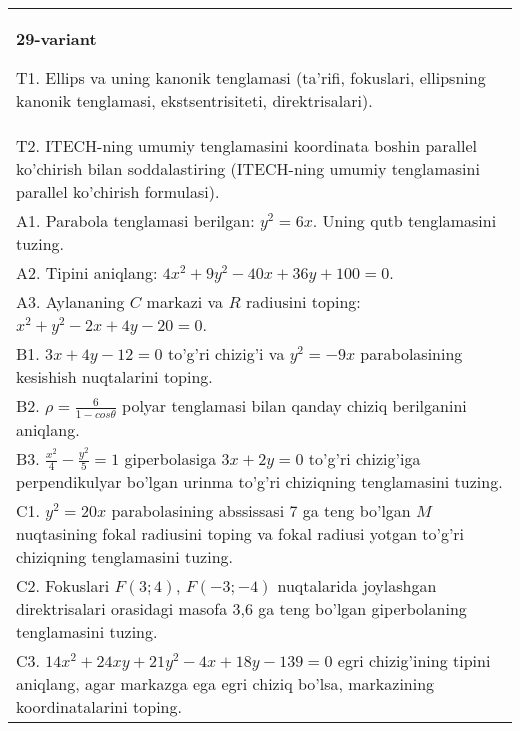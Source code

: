 \documentclass{article}
\begin{document}
\begin{tabular}{m{17cm}}
\textbf{29-variant}
\newline

T1. Ellips va uning kanonik tenglamasi (ta'rifi, fokuslari, ellipsning kanonik tenglamasi, ekstsentrisiteti, direktrisalari).\\

T2. ITECH-ning umumiy tenglamasini koordinata boshin parallel ko'chirish bilan soddalastiring (ITECH-ning umumiy tenglamasini parallel ko'chirish formulasi).\\

A1. Parabola tenglamasi berilgan: $y^2=6x$. Uning qutb tenglamasini tuzing.\\

A2. Tipini aniqlang: $4x^2+9y^2-40x+36y+100=0$.\\

A3. Aylananing $C$ markazi va $R$ radiusini toping: $x^2+y^2-2x+4y-20=0$.\\

B1. $3x + 4y - 12 = 0$ to'g'ri chizig'i va $y^{2} = - 9x$ parabolasining kesishish nuqtalarini toping.\\

B2. $\rho = \frac{6}{1 - cos\theta}$ polyar tenglamasi bilan qanday chiziq berilganini aniqlang.  \\

B3. $\frac{x^{2}}{4} - \frac{y^{2}}{5} = 1$ giperbolasiga $3x + 2y = 0$ to'g'ri chizig'iga perpendikulyar bo'lgan urinma to'g'ri chiziqning tenglamasini tuzing.\\

C1. $y^{2} = 20x$ parabolasining abssissasi 7 ga teng bo'lgan $M$ nuqtasining fokal radiusini toping va fokal radiusi yotgan to'g'ri chiziqning tenglamasini tuzing.  \\

C2. Fokuslari $F(3;4)$, $F(-3;-4)$ nuqtalarida joylashgan direktrisalari orasidagi masofa 3,6 ga teng bo'lgan giperbolaning tenglamasini tuzing.  \\

C3. $14x^{2} + 24xy + 21y^{2} - 4x + 18y - 139 = 0$ egri chizig'ining tipini aniqlang, agar markazga ega egri chiziq bo'lsa, markazining koordinatalarini toping.  \\

\end{tabular}
\vspace{1cm}
\end{document}
